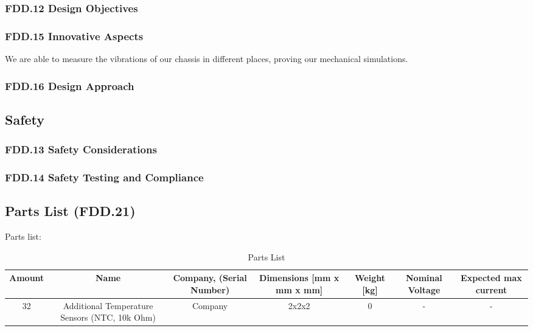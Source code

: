 \subsubsection{FDD.12 Design Objectives}
 
\subsubsection{FDD.15 Innovative Aspects}
\par We are able to measure the vibrations of our chassis in different places, proving our mechanical simulations.
\subsubsection{FDD.16 Design Approach}
 
\subsection{Safety}
\subsubsection{FDD.13 Safety Considerations}
 
\subsubsection{FDD.14 Safety Testing and Compliance}
 
\subsection{Parts List (FDD.21)}
Parts list:
\begin{table}[h]
    \centering
    \caption{Parts List}
        \begin{adjustbox}{width=\textwidth,center}
    \begin{tabular}{|c|c|c|c|c|c|c|}
        \hline
        \textbf{Amount} & \textbf{Name} & \textbf{Company, (Serial Number)} & \textbf{Dimensions [mm x mm x mm]} & \textbf{Weight [kg]} & \textbf{Nominal Voltage} & \textbf{Expected max current} \\
        \hline
        32 & Additional Temperature Sensors (NTC, 10k Ohm) & Company & 2x2x2 & 0 & - & - \\
    \end{tabular}
        \end{adjustbox}
\end{table}


\newpage
\newpage

